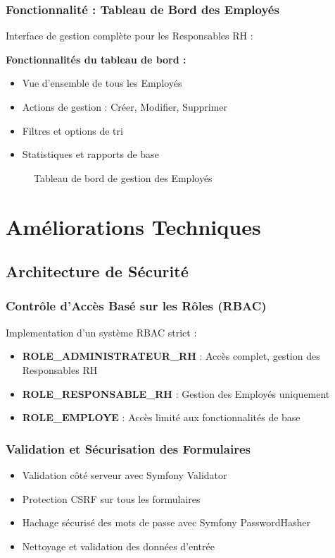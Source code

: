 \documentclass[12pt,a4paper]{article}
\begin{document}
\subsubsection{Fonctionnalité : Tableau de Bord des Employés}
Interface de gestion complète pour les Responsables RH :

\textbf{Fonctionnalités du tableau de bord :}
\begin{itemize}
    \item Vue d'ensemble de tous les Employés
    \item Actions de gestion : Créer, Modifier, Supprimer
    \item Filtres et options de tri
    \item Statistiques et rapports de base
\end{itemize}

\begin{figure}[H]
    \centering
    \caption{Tableau de bord de gestion des Employés}
    \label{fig:responsable_liste_employes}
\end{figure}

\section{Améliorations Techniques}

\subsection{Architecture de Sécurité}

\subsubsection{Contrôle d'Accès Basé sur les Rôles (RBAC)}
Implementation d'un système RBAC strict :

\begin{itemize}
    \item \textbf{ROLE\_ADMINISTRATEUR\_RH} : Accès complet, gestion des Responsables RH
    \item \textbf{ROLE\_RESPONSABLE\_RH} : Gestion des Employés uniquement
    \item \textbf{ROLE\_EMPLOYE} : Accès limité aux fonctionnalités de base
\end{itemize}

\subsubsection{Validation et Sécurisation des Formulaires}
\begin{itemize}
    \item Validation côté serveur avec Symfony Validator
    \item Protection CSRF sur tous les formulaires
    \item Hachage sécurisé des mots de passe avec Symfony PasswordHasher
    \item Nettoyage et validation des données d'entrée
\end{itemize}
\end{document}
